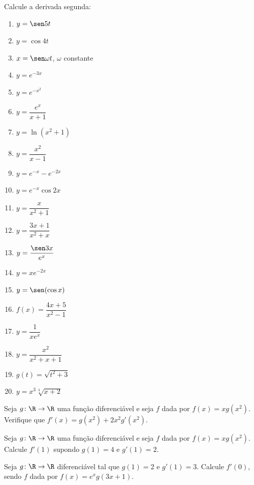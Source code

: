 \begin{exercicio}[5]
\label{ex:7.11.5}
Calcule a derivada segunda:
\begin{enumerate}[label=\alph*)]
    \item $y = \sen 5t$
    \item $y = \cos 4t$
    \item $x = \sen\omega t$, $\omega$ constante
    \item $y = e^{-3x}$
    \item $y = e^{-x^2}$
    \item $y = \dfrac{e^x}{x + 1}$
    \item $y = \ln(x^2 + 1)$
    \item $y = \dfrac{x^2}{x - 1}$
    \item $y = e^{-x} - e^{-2x}$
    \item $y = e^{-x}\cos 2x$
    \item $y = \dfrac{x}{x^2 + 1}$
    \item $y = \dfrac{3x + 1}{x^2 + x}$
    \item $y = \dfrac{\sen 3x}{e^x}$
    \item $y = xe^{-2x}$
    \item $y = \sen(\cos x)$
    \item $f(x) = \dfrac{4x + 5}{x^2 - 1}$
    \item $y = \dfrac{1}{xe^x}$
    \item $y = \dfrac{x^2}{x^2 + x + 1}$
    \item $g(t) = \sqrt{t^2 + 3}$
    \item $y = x^3 \sqrt[3]{x + 2}$
\end{enumerate}
\end{exercicio}

\begin{exercicio}[6]
\label{ex:7.11.6}
Seja $g\colon \R \to \R$ uma função diferenciável e seja $f$ dada por $f(x) = xg(x^2)$. Verifique que $f'(x) = g(x^2) + 2x^2 g'(x^2)$.
\end{exercicio}

\begin{exercicio}[7]
\label{ex:7.11.7}
Seja $g\colon \R \to \R$ uma função diferenciável e seja $f$ dada por $f(x) = xg(x^2)$. Calcule $f'(1)$ supondo $g(1) = 4$ e $g'(1) = 2$.
\end{exercicio}

\begin{exercicio}[8]
\label{ex:7.11.8}
Seja $g\colon \R \to \R$ diferenciável tal que $g(1) = 2$ e $g'(1) = 3$. Calcule $f'(0)$, sendo $f$ dada por $f(x) = e^x g(3x + 1)$.
\end{exercicio}

